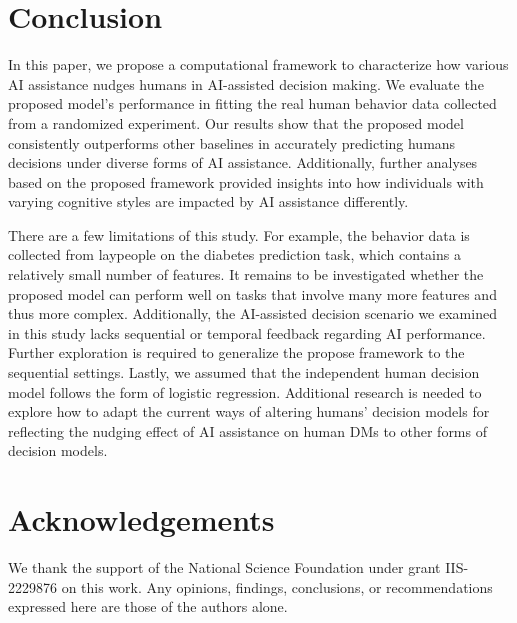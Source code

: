 \documentclass[letterpaper]{article} %
\begin{document}
\section{Conclusion}
In this paper, we propose a  computational framework to characterize how various AI assistance nudges humans in AI-assisted decision making. We evaluate the proposed model's performance in fitting the real human behavior data collected from a randomized experiment. Our results show that the proposed model consistently outperforms
other baselines in accurately predicting humans decisions under diverse forms of AI assistance.  Additionally, further analyses based on the proposed framework provided insights into how individuals with varying cognitive styles are impacted by AI assistance differently.

There are a few limitations of this study. 
For example, the behavior data is collected from laypeople on the diabetes
prediction task, which contains a relatively small number of features. It remains to be investigated whether the proposed model can perform well on tasks that involve many more features and thus more complex. Additionally, the AI-assisted decision scenario we examined in this study lacks sequential or temporal feedback regarding AI performance. Further exploration is required to generalize the propose framework to the sequential settings. Lastly, we assumed that the independent human decision model follows the form of logistic regression. Additional research is needed to explore how to adapt the current ways of altering humans' decision models for reflecting the nudging effect of AI assistance on human DMs to other forms of decision models.


\newpage

\section*{Acknowledgements}
We thank the support of the National Science Foundation
under grant IIS-2229876 on this work.
Any opinions, findings, conclusions, or recommendations expressed here are those of the authors alone.




\newpage
\appendix
\end{document}
